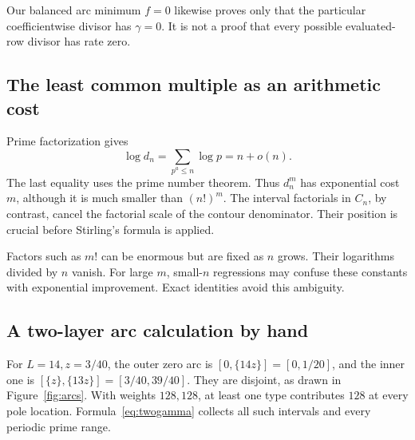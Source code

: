 Our balanced arc minimum \(f=0\) likewise proves only that the
particular coefficientwise divisor has \(\gamma=0\). It is not a
proof that every possible evaluated-row divisor has rate zero.

\subsection{The least common multiple as an arithmetic cost}

Prime factorization gives
\[
\log d_n=\sum_{p^a\le n}\log p=n+o(n).
\]
The last equality uses the prime number theorem. Thus \(d_n^m\)
has exponential cost \(m\), although it is much smaller than
\((n!)^m\). The interval factorials in \(C_n\), by contrast,
cancel the factorial scale of the contour denominator.
Their position is crucial before Stirling's formula is applied.

Factors such as \(m!\) can be enormous but are fixed as \(n\)
grows. Their logarithms divided by \(n\) vanish.
For large \(m\), small-\(n\) regressions may confuse these constants
with exponential improvement. Exact identities avoid this ambiguity.

\subsection{A two-layer arc calculation by hand}

For \(L=14,z=3/40\), the outer zero arc is
\([0,\{14z\}]=[0,1/20]\), and the inner one is
\([\{z\},\{13z\}]=[3/40,39/40]\).
They are disjoint, as drawn in Figure~\ref{fig:arcs}.
With weights \(128,128\), at least one type contributes \(128\)
at every pole location. Formula~\eqref{eq:twogamma} collects
all such intervals and every periodic prime range.
